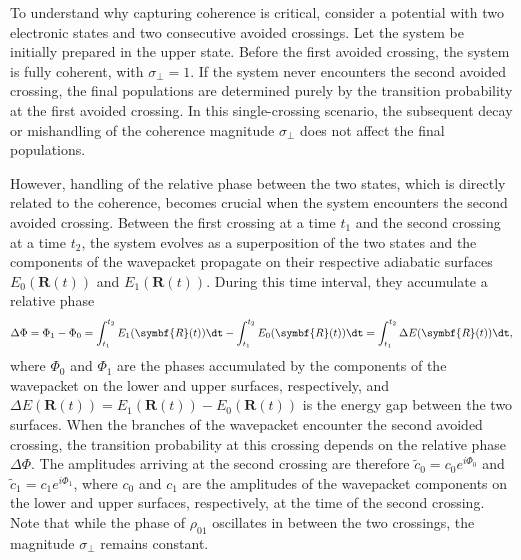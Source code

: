 To understand why capturing coherence is critical, consider a potential with two electronic states and two consecutive avoided crossings. Let the system be initially prepared in the upper state. Before the first avoided crossing, the system is fully coherent, with $\sigma_\perp=1$. If the system never encounters the second avoided crossing, the final populations are determined purely by the transition probability at the first avoided crossing. In this single-crossing scenario, the subsequent decay or mishandling of the coherence magnitude $\sigma_\perp$ does not affect the final populations.

However, handling of the relative phase between the two states, which is directly related to the coherence, becomes crucial when the system encounters the second avoided crossing. Between the first crossing at a time $t_1$ and the second crossing at a time $t_2$, the system evolves as a superposition of the two states and the components of the wavepacket propagate on their respective adiabatic surfaces $E_0(\symbf{R}(t))$ and $E_1(\symbf{R}(t))$. During this time interval, they accumulate a relative phase
\begin{equation}
\Delta\Phi=\Phi_1-\Phi_0=\int_{t_1}^{t_2}E_1(\symbf{R}(t))\dt-\int_{t_1}^{t_2}E_0(\symbf{R}(t))\dt=\int_{t_1}^{t_2}\Delta E(\symbf{R}(t))\dt,
\end{equation}
where $\Phi_0$ and $\Phi_1$ are the phases accumulated by the components of the wavepacket on the lower and upper surfaces, respectively, and $\Delta E(\symbf{R}(t))=E_1(\symbf{R}(t))-E_0(\symbf{R}(t))$ is the energy gap between the two surfaces. When the branches of the wavepacket encounter the second avoided crossing, the transition probability at this crossing depends on the relative phase $\Delta\Phi$. The amplitudes arriving at the second crossing are therefore $\tilde c_0=c_0e^{i\Phi_0}$ and $\tilde c_1=c_1e^{i\Phi_1}$, where $c_0$ and $c_1$ are the amplitudes of the wavepacket components on the lower and upper surfaces, respectively, at the time of the second crossing. Note that while the phase of $\rho_{01}$ oscillates in between the two crossings, the magnitude $\sigma_\perp$ remains constant.

